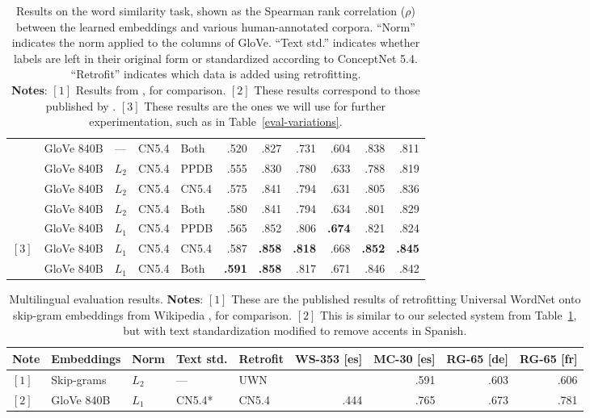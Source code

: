 \documentclass[letterpaper]{article}
\begin{document}
\begin{table*}[t]
\begin{tabular}{lllllrrrrrr}
     &GloVe 840B   & ---   & CN5.4     & Both     &     .520 &     .827 &      .731 &      .604 &     .838 &     .811 \\
     &GloVe 840B   & $L_2$ & CN5.4     & PPDB     &     .555 &     .830 &      .780 &      .633 &     .788 &     .819 \\
     &GloVe 840B   & $L_2$ & CN5.4     & CN5.4    &     .575 &     .841 &      .794 &      .631 &     .805 &     .836 \\
     &GloVe 840B   & $L_2$ & CN5.4     & Both     &     .580 &     .841 &      .794 &      .634 &     .801 &     .829 \\
     &GloVe 840B   & $L_1$ & CN5.4     & PPDB     &     .565 &     .852 &      .806 & {\bf .674}&     .821 &     .824 \\
$[3]$&GloVe 840B   & $L_1$ & CN5.4     & CN5.4    &     .587 &{\bf .858}& {\bf .818}&      .668 &{\bf .852}&{\bf .845}\\
     &GloVe 840B   & $L_1$ & CN5.4     & Both     &{\bf .591}&{\bf .858}&      .817 &      .671 &     .846 &     .842 \\
\bottomrule
\end{tabular}

\caption{
    Results on the word similarity task, shown as the Spearman rank correlation
    ($\rho$) between the learned embeddings and various human-annotated corpora.
    ``Norm'' indicates the norm applied to the columns of GloVe.
    ``Text std.'' indicates whether labels are left in their original form or
    standardized according to ConceptNet 5.4. ``Retrofit'' indicates which data
    is added using retrofitting.\\
    {\bf Notes}: $[1]$ Results from , for comparison. $[2]$ These results correspond to those published by .
    $[3]$ These results are the ones we will use for further experimentation, such as in Table~\ref{eval-variations}.
}
\label{eval-retro-standardize}
\end{table*}

\begin{table*}[t]
\centering
\begin{tabular}{lllllrrrr}
\toprule
Note &Embeddings   & Norm  & Text std. & Retrofit & WS-353 [es] & MC-30 [es] & RG-65 [de] & RG-65 [fr] \\
\midrule
$[1]$&Skip-grams   & $L_2$ & ---       & UWN      &             &       .591 &       .603 &       .606 \\
$[2]$&GloVe 840B   & $L_1$ & CN5.4*    & CN5.4    &        .444 &       .765 &       .673 &       .781 \\
\bottomrule
\end{tabular}

\caption{
    Multilingual evaluation results.
    {\bf Notes}: $[1]$ These are the published results of retrofitting
    Universal WordNet onto skip-gram embeddings from Wikipedia
    \cite{faruqui2014retrofitting}, for comparison. $[2]$ This is similar to our
    selected system from Table~\ref{eval-retro-standardize}, but with text
    standardization modified to remove accents in Spanish.
}
\label{eval-multilingual}
\end{table*}
\end{document}
